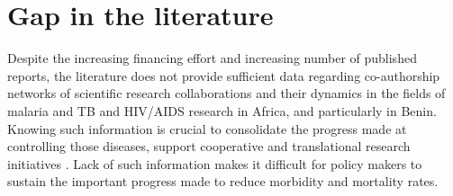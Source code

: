 \section{Gap in the literature}
Despite the increasing financing effort and increasing number of published reports, the literature does not provide sufficient data regarding co-authorship networks of scientific research collaborations and their dynamics in the fields of malaria and TB and HIV/AIDS research in Africa, and particularly in Benin. Knowing such information is crucial to consolidate the progress made at controlling those diseases, support cooperative and translational research initiatives \cite{gonzalez-alcaide_scientific_2012}. Lack of such information makes it difficult for policy makers to sustain the important progress made to reduce morbidity and mortality rates.
